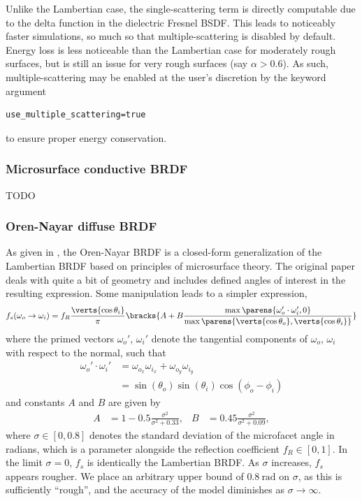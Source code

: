 \documentclass[
    twoside,
    twocolumn,
    letterpaper,
    10pt]{article}
\begin{document}
Unlike the Lambertian case, the single-scattering term is directly 
computable due to the delta function 
in the dielectric Fresnel BSDF. This leads to noticeably faster
simulations, so much so that multiple-scattering is disabled by 
default. Energy loss is less noticeable than the Lambertian case
for moderately rough surfaces,
but is still an issue for very rough surfaces 
(say $\alpha > 0.6$). As such, multiple-scattering may be 
enabled at the user's discretion by the keyword argument
\begin{lstlisting}
use_multiple_scattering=true
\end{lstlisting}
to ensure proper energy conservation.

\subsubsection{Microsurface conductive BRDF}
\label{sec:doc-layers-microsurface-conductive}

TODO

\subsubsection{Oren-Nayar diffuse BRDF}
\label{sec:doc-layers-oren-nayar-diffuse}

As given in \cite{Oren:94}, the Oren-Nayar BRDF is a closed-form 
generalization of the Lambertian BRDF based on principles of microsurface 
theory. The original paper deals with quite a bit of geometry and includes
defined angles of interest in the resulting expression. Some
manipulation leads to a simpler expression,
\begin{equation*}
    f_s(\omega_o \to \omega_i) = f_R
    \frac{\verts{\cos{\theta_i}}}{\pi}
    \bracks{A + B\frac{\max\parens{\omega_o'\cdot\omega_i', 0}}
                      {\max\parens{\verts{\cos{\theta_o}},
                                   \verts{\cos{\theta_i}}}}}
\end{equation*}
where the primed vectors $\omega_o'$, $\omega_i'$ denote the 
tangential components of $\omega_o$, $\omega_i$ with respect to 
the normal, such that
\begin{align*}
    \omega_o'\cdot\omega_i' &= 
    \omega_{o_x}\omega_{i_x} + 
    \omega_{o_y}\omega_{i_y} \\
    &=
    \sin{(\theta_o)}
    \sin{(\theta_i)}
    \cos{(\phi_o - \phi_i)}
\end{align*}
and constants $A$ and $B$ are given by
\begin{align*}
    A &= 1 - 0.5\frac{\sigma^2}{\sigma^2 + 0.33},&
    B &= 0.45\frac{\sigma^2}{\sigma^2 + 0.09},
\end{align*}
where $\sigma \in [0, 0.8]$ denotes the standard deviation of the
microfacet angle in radians, which is a parameter alongside the reflection 
coefficient $f_R \in [0, 1]$. In the limit $\sigma = 0$, $f_s$ is identically 
the Lambertian BRDF. As $\sigma$ increases, $f_s$ appears rougher. We place an
arbitrary upper bound of $\SI{0.8}{\radian}$ on $\sigma$, as this is 
sufficiently ``rough'', and the accuracy of the model diminishes as 
$\sigma \to \infty$.
\end{document}
